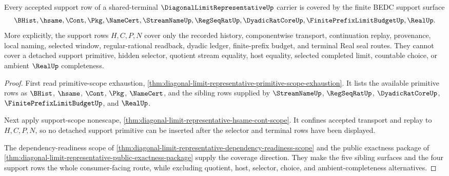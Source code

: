 \begin{theorem}
\label{thm:diagonal-limit-representative-support-route-coverage}
Every accepted support row of a shared-terminal $\DiagonalLimitRepresentativeUp$ carrier is covered by the finite BEDC support surface
$$
\BHist,\hsame,\Cont,\Pkg,\NameCert,\StreamNameUp,\RegSeqRatUp,\DyadicRatCoreUp,\FinitePrefixLimitBudgetUp,\RealUp.
$$
More explicitly, the support rows $H,C,P,N$ cover only the recorded history, componentwise transport, continuation replay, provenance, local naming, selected window, regular-rational readback, dyadic ledger, finite-prefix budget, and terminal Real seal routes. They cannot cover a detached support primitive, hidden selector, quotient stream equality, host equality, selected completed limit, countable choice, or ambient $\RealUp$ completeness.
\end{theorem}
\begin{proof}
First read primitive-scope exhaustion, \autoref{thm:diagonal-limit-representative-primitive-scope-exhaustion}. It lists the available primitive rows as $\BHist$, $\hsame$, $\Cont$, $\Pkg$, $\NameCert$, and the sibling rows supplied by $\StreamNameUp$, $\RegSeqRatUp$, $\DyadicRatCoreUp$, $\FinitePrefixLimitBudgetUp$, and $\RealUp$.

Next apply support-scope nonescape, \autoref{thm:diagonal-limit-representative-hsame-cont-scope}. It confines accepted transport and replay to $H,C,P,N$, so no detached support primitive can be inserted after the selector and terminal rows have been displayed.

The dependency-readiness scope of \autoref{thm:diagonal-limit-representative-dependency-readiness-scope} and the public exactness package of \autoref{thm:diagonal-limit-representative-public-exactness-package} supply the coverage direction. They make the five sibling surfaces and the four support rows the whole consumer-facing route, while excluding quotient, host, selector, choice, and ambient-completeness alternatives.
\end{proof}

